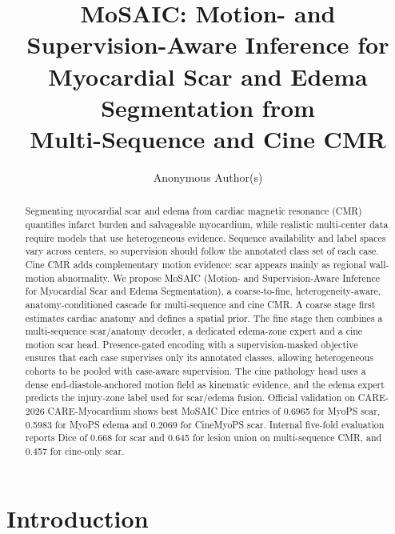 \documentclass[runningheads]{llncs}
\begin{document}
\title{MoSAIC: Motion- and Supervision-Aware Inference for\\
Myocardial Scar and Edema Segmentation from\\
Multi-Sequence and Cine CMR}

\author{Anonymous Author(s)}

\maketitle

\begin{abstract}
Segmenting myocardial scar and edema from cardiac magnetic resonance (CMR)
quantifies infarct burden and salvageable myocardium, while realistic
multi-center data require models that use heterogeneous evidence. Sequence
availability and label spaces vary across centers, so supervision should follow
the annotated class set of each case. Cine CMR adds complementary motion
evidence: scar appears mainly as regional wall-motion abnormality. We propose
MoSAIC (Motion- and Supervision-Aware Inference for Myocardial Scar and Edema
Segmentation), a coarse-to-fine, heterogeneity-aware, anatomy-conditioned cascade
for multi-sequence and cine CMR. A coarse stage first estimates cardiac anatomy
and defines a spatial prior. The fine stage then combines a multi-sequence
scar/anatomy decoder, a dedicated edema-zone expert and a cine motion scar head.
Presence-gated encoding with a supervision-masked objective ensures that each
case supervises only its annotated classes, allowing heterogeneous cohorts to be
pooled with case-aware supervision. The cine pathology head uses a dense
end-diastole-anchored motion field as kinematic evidence, and the edema expert
predicts the injury-zone label used for scar/edema fusion. Official validation on
CARE-2026 CARE-Myocardium shows best MoSAIC Dice entries of 0.6965 for MyoPS
scar, 0.5983 for MyoPS edema and 0.2069 for CineMyoPS scar. Internal five-fold
evaluation reports Dice of 0.668 for scar and 0.645 for lesion union on
multi-sequence CMR, and 0.457 for cine-only scar.

\end{abstract}

\section{Introduction}
\end{document}
